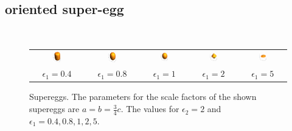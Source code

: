 \clearpage
\subsection{oriented super-egg} ~\\

\begin{figure}[htb]
\begin{tabular}{ccccc}
     \includegraphics[width=0.18\textwidth]{../images/form_factor/supershapes/SuperEggPietHein.png}
    & \includegraphics[width=0.18\textwidth]{../images/form_factor/supershapes/SuperEgg08.png}
    & \includegraphics[width=0.18\textwidth]{../images/form_factor/supershapes/SuperEgg1.png}
    & \includegraphics[width=0.18\textwidth]{../images/form_factor/supershapes/SuperEgg2.png}
    & \includegraphics[width=0.18\textwidth]{../images/form_factor/supershapes/SuperEgg5.png} \\
     $\epsilon_1=0.4$ & $\epsilon_1=0.8$ & $\epsilon_1=1$ & $\epsilon_1=2$ & $\epsilon_1=5$
\end{tabular}
\caption{Supereggs. The parameters for the scale factors of the shown supereggs are $a = b = \frac34 c $. The values for $\epsilon_2=2$ and $\epsilon_1=0.4, 0.8, 1,2,5$.}
\label{fig:opo_superegg}
\end{figure}


